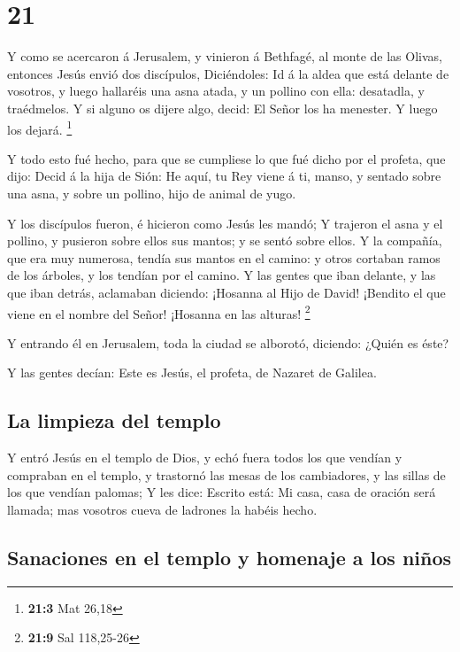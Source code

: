 \hypertarget{section-20}{%
\section{21}\label{section-20}}

 Y como se acercaron á Jerusalem, y vinieron á Bethfagé, al
monte de las Olivas, entonces Jesús envió dos discípulos, 
Diciéndoles: Id á la aldea que está delante de vosotros, y luego
hallaréis una asna atada, y un pollino con ella: desatadla, y
traédmelos.  Y si alguno os dijere algo, decid: El Señor los
ha menester. Y luego los dejará. \footnote{\textbf{21:3} Mat 26,18}

 Y todo esto fué hecho, para que se cumpliese lo que fué
dicho por el profeta, que dijo:  Decid á la hija de Sión: He
aquí, tu Rey viene á ti, manso, y sentado sobre una asna, y sobre un
pollino, hijo de animal de yugo.

 Y los discípulos fueron, é hicieron como Jesús les mandó;
 Y trajeron el asna y el pollino, y pusieron sobre ellos sus
mantos; y se sentó sobre ellos.  Y la compañía, que era muy
numerosa, tendía sus mantos en el camino: y otros cortaban ramos de los
árboles, y los tendían por el camino.  Y las gentes que iban
delante, y las que iban detrás, aclamaban diciendo: ¡Hosanna al Hijo de
David! ¡Bendito el que viene en el nombre del Señor! ¡Hosanna en las
alturas! \footnote{\textbf{21:9} Sal 118,25-26}

 Y entrando él en Jerusalem, toda la ciudad se alborotó,
diciendo: ¿Quién es éste?

 Y las gentes decían: Este es Jesús, el profeta, de Nazaret
de Galilea.

\hypertarget{la-limpieza-del-templo}{%
\subsection{La limpieza del templo}\label{la-limpieza-del-templo}}

 Y entró Jesús en el templo de Dios, y echó fuera todos los
que vendían y compraban en el templo, y trastornó las mesas de los
cambiadores, y las sillas de los que vendían palomas;  Y
les dice: Escrito está: Mi casa, casa de oración será llamada; mas
vosotros cueva de ladrones la habéis hecho.

\hypertarget{sanaciones-en-el-templo-y-homenaje-a-los-niuxf1os}{%
\subsection{Sanaciones en el templo y homenaje a los
niños}\label{sanaciones-en-el-templo-y-homenaje-a-los-niuxf1os}}

